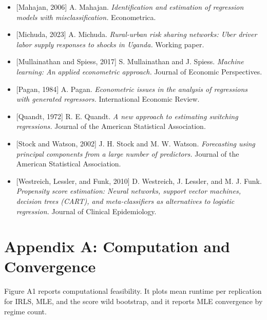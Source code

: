 \documentclass[
  12pt,
  letterpaper]{article}
\begin{document}
\begin{itemize}
\item
  {[}Mahajan, 2006{]} A. Mahajan. \emph{Identification and estimation of
  regression models with misclassification.} Econometrica.
\item
  {[}Michuda, 2023{]} A. Michuda. \emph{Rural-urban risk sharing
  networks: Uber driver labor supply responses to shocks in Uganda.}
  Working paper.
\item
  {[}Mullainathan and Spiess, 2017{]} S. Mullainathan and J. Spiess.
  \emph{Machine learning: An applied econometric approach.} Journal of
  Economic Perspectives.
\item
  {[}Pagan, 1984{]} A. Pagan. \emph{Econometric issues in the analysis
  of regressions with generated regressors.} International Economic
  Review.
\item
  {[}Quandt, 1972{]} R. E. Quandt. \emph{A new approach to estimating
  switching regressions.} Journal of the American Statistical
  Association.
\item
  {[}Stock and Watson, 2002{]} J. H. Stock and M. W. Watson.
  \emph{Forecasting using principal components from a large number of
  predictors.} Journal of the American Statistical Association.
\item
  {[}Westreich, Lessler, and Funk, 2010{]} D. Westreich, J. Lessler, and
  M. J. Funk. \emph{Propensity score estimation: Neural networks,
  support vector machines, decision trees (CART), and meta-classifiers
  as alternatives to logistic regression.} Journal of Clinical
  Epidemiology.
\end{itemize}

\newpage

\appendix
\renewcommand{\thesection}{\Alph{section}}
\renewcommand{\theequation}{\Alph{section}\arabic{equation}}
\renewcommand{\thetable}{\Alph{section}\arabic{table}}
\renewcommand{\thefigure}{\Alph{section}\arabic{figure}}
\setcounter{equation}{0}
\setcounter{table}{0}
\setcounter{figure}{0}

\section*{Appendix A: Computation and
Convergence}\label{appendix-a-computation-and-convergence}

Figure A1 reports computational feasibility. It plots mean runtime per
replication for IRLS, MLE, and the score wild bootstrap, and it reports
MLE convergence by regime count.
\end{document}
